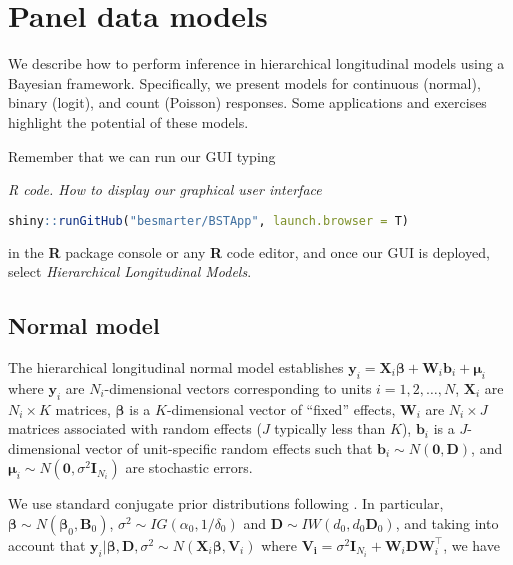 \chapter{Panel data models}\label{chap9}

We describe how to perform inference in hierarchical longitudinal models using a Bayesian framework. Specifically, we present models for continuous (normal), binary (logit), and count (Poisson) responses. Some applications and exercises highlight the potential of these models.

Remember that we can run our GUI typing

\begin{tcolorbox}[enhanced,width=4.67in,center upper,
	fontupper=\large\bfseries,drop shadow southwest,sharp corners]
	\textit{R code. How to display our graphical user interface}
	\begin{VF}
		\begin{lstlisting}[language=R]
		shiny::runGitHub("besmarter/BSTApp", launch.browser = T)\end{lstlisting}
	\end{VF}
\end{tcolorbox} 

in the \textbf{R} package console or any \textbf{R} code editor, and once our GUI is deployed, select \textit{Hierarchical Longitudinal Models}.

\section{Normal model}\label{sec91}

The hierarchical longitudinal normal model establishes $\bm{y}_i=\bm{X}_i\bm{\beta}+\bm{W}_i\bm{b}_i+\bm{\mu}_i$ where $\bm{y}_i$ are $N_i$-dimensional vectors corresponding to units $i=1,2,\dots,N$, $\bm{X}_i$ are $N_i\times K$ matrices, $\bm{\beta}$ is a $K$-dimensional vector of ``fixed'' effects, $\bm{W}_i$ are $N_i\times J$ matrices associated with random effects ($J$ typically less than $K$), $\bm{b}_i$ is a $J$-dimensional vector of unit-specific random effects such that $\bm{b}_i\sim{N}(\bm{0},\bm{D})$, and $\bm{\mu}_i\sim{N}(\bm{0},\sigma^2\bm{I}_{N_i})$ are stochastic errors.

We use standard conjugate prior distributions following \cite{Chib1999}.
In particular, $\bm{\beta} \sim {N}(\bm{\beta}_0,\bm{B}_0)$, 
$\sigma^2 \sim {I}{G}(\alpha_0, 1/\delta_0)$ and $\bm{D}\sim{I}{W}(d_0,d_0\bm{D}_0)$, and taking into account that $\bm{y}_i|\bm{\beta},\bm{D},\sigma^2\sim{N}(\bm{X}_i\bm{\beta},\bm{V}_i)$ where $\bm{V_i}=\sigma^2\bm{I}_{N_i}+\bm{W}_i\bm{D}\bm{W}_i^{\top}$, we have

